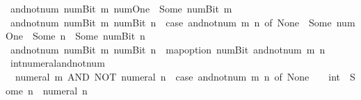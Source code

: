 \begin{isabellebody}
{\isacharbar}{\kern0pt}\ {\isacartoucheopen}and{\isacharunderscore}{\kern0pt}not{\isacharunderscore}{\kern0pt}num\ {\isacharparenleft}{\kern0pt}num{\isachardot}{\kern0pt}Bit{}\ m{\isacharparenright}{\kern0pt}\ num{\isachardot}{\kern0pt}One\ {\isacharequal}{\kern0pt}\ Some\ {\isacharparenleft}{\kern0pt}num{\isachardot}{\kern0pt}Bit{}\ m{\isacharparenright}{\kern0pt}{\isacartoucheclose}\isanewline
{\isacharbar}{\kern0pt}\ {\isacartoucheopen}and{\isacharunderscore}{\kern0pt}not{\isacharunderscore}{\kern0pt}num\ {\isacharparenleft}{\kern0pt}num{\isachardot}{\kern0pt}Bit{}\ m{\isacharparenright}{\kern0pt}\ {\isacharparenleft}{\kern0pt}num{\isachardot}{\kern0pt}Bit{}\ n{\isacharparenright}{\kern0pt}\ {\isacharequal}{\kern0pt}\ {\isacharparenleft}{\kern0pt}case\ and{\isacharunderscore}{\kern0pt}not{\isacharunderscore}{\kern0pt}num\ m\ n\ of\ None\ {\isasymRightarrow}\ Some\ num{\isachardot}{\kern0pt}One\ {\isacharbar}{\kern0pt}\ Some\ n{\isacharprime}{\kern0pt}\ {\isasymRightarrow}\ Some\ {\isacharparenleft}{\kern0pt}num{\isachardot}{\kern0pt}Bit{}\ n{\isacharprime}{\kern0pt}{\isacharparenright}{\kern0pt}{\isacharparenright}{\kern0pt}{\isacartoucheclose}\isanewline
{\isacharbar}{\kern0pt}\ {\isacartoucheopen}and{\isacharunderscore}{\kern0pt}not{\isacharunderscore}{\kern0pt}num\ {\isacharparenleft}{\kern0pt}num{\isachardot}{\kern0pt}Bit{}\ m{\isacharparenright}{\kern0pt}\ {\isacharparenleft}{\kern0pt}num{\isachardot}{\kern0pt}Bit{}\ n{\isacharparenright}{\kern0pt}\ {\isacharequal}{\kern0pt}\ map{\isacharunderscore}{\kern0pt}option\ num{\isachardot}{\kern0pt}Bit{}\ {\isacharparenleft}{\kern0pt}and{\isacharunderscore}{\kern0pt}not{\isacharunderscore}{\kern0pt}num\ m\ n{\isacharparenright}{\kern0pt}{\isacartoucheclose}\isanewline
\isanewline
{}\isamarkupfalse%
\ int{\isacharunderscore}{\kern0pt}numeral{\isacharunderscore}{\kern0pt}and{\isacharunderscore}{\kern0pt}not{\isacharunderscore}{\kern0pt}num{\isacharcolon}{\kern0pt}\isanewline
\ \ {\isacartoucheopen}numeral\ m\ AND\ NOT\ {\isacharparenleft}{\kern0pt}numeral\ n{\isacharparenright}{\kern0pt}\ {\isacharequal}{\kern0pt}\ {\isacharparenleft}{\kern0pt}case\ and{\isacharunderscore}{\kern0pt}not{\isacharunderscore}{\kern0pt}num\ m\ n\ of\ None\ {\isasymRightarrow}\ {}\ {\isacharcolon}{\kern0pt}{\isacharcolon}{\kern0pt}\ int\ {\isacharbar}{\kern0pt}\ Some\ n{\isacharprime}{\kern0pt}\ {\isasymRightarrow}\ numeral\ n{\isacharprime}{\kern0pt}{\isacharparenright}{\kern0pt}{\isacartoucheclose}\isanewline

\end{isabellebody}
